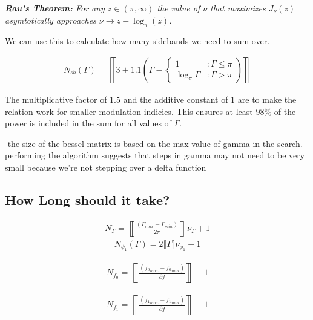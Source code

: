 \documentclass[onecolumn, groupedaddress, 10pt]{revtex4-1}
\begin{document}
\textit{\textbf{Rau's Theorem:} For any $z\in (\pi,\infty)$ the value of $\nu$ that maximizes $J_\nu (z)$ asymtotically approaches $\nu \to z - \log_\pi (z)$.}

We can use this to calculate how many sidebands we need to sum over.  


\begin{align}
N_{sb} (\Gamma) 
= \left\llbracket
3 + 1.1 \left( \Gamma -
\left\{
     \begin{array}{lr}
       1               & : \Gamma \leq \pi    \\
       \log_\pi \Gamma & : \Gamma   >  \pi
     \end{array}
   \right.
   \right)
   \right\rrbracket
\end{align}

The multiplicative factor of $1.5$ and the additive constant of $1$ are to make the relation work for smaller modulation indicies.  This ensures at least $98\%$ of the power is included in the sum for all values of $\Gamma$.

-the size of the bessel matrix is based on the max value of gamma in the search.
-performing the algorithm suggests that steps in gamma may not need to be very small because we're not stepping over a delta function





\subsection{How Long should it take?}
\begin{align}
\boxed{
N_\Gamma = \left\llbracket \frac{(\Gamma_{max} - \Gamma_{min})}{2\pi} \right\rrbracket \nu_\Gamma + 1
}
\end{align}
\begin{align}
\boxed{
N_{\phi_1} (\Gamma) = 2 \llbracket \Gamma \rrbracket \nu_{\phi_1} + 1
}
\end{align}

\begin{align}
\boxed{
N_{f_0} = \left\llbracket \frac{({f_0}_{max} - {f_0}_{min})}{\partial f} \right\rrbracket + 1
}
\end{align}

\begin{align}
\boxed{
N_{f_1} = \left\llbracket \frac{({f_1}_{max} - {f_1}_{min})}{\partial f} \right\rrbracket + 1
}
\end{align}
\end{document}
